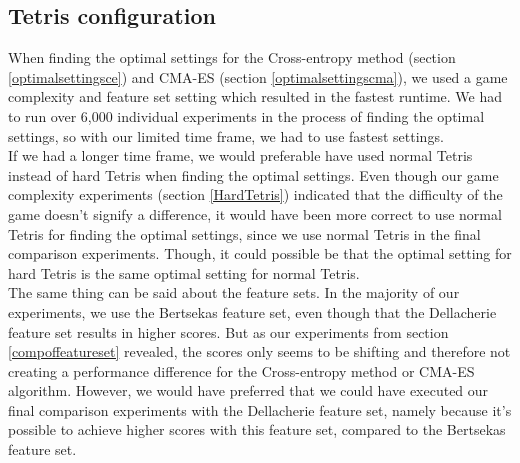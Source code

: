 \subsection{Tetris configuration}

When finding the optimal settings for the Cross-entropy method (section \ref{optimalsettingsce})
and CMA-ES (section \ref{optimalsettingscma}), we used a game complexity and feature set 
setting which resulted in the fastest runtime. We had to run over 6,000 individual experiments
in the process of finding the optimal settings, so with our limited time frame, we had
to use fastest settings.\\
If we had a longer time frame, we would preferable have used normal Tetris instead
of hard Tetris when finding the optimal settings. Even though our game complexity experiments
(section \ref{HardTetris}) indicated that the difficulty of the game doesn't signify a difference, it would have been more correct to use normal Tetris for finding the optimal settings, since
we use normal Tetris in the final comparison experiments. Though, it could possible be that the
optimal setting for hard Tetris is the same optimal setting for normal Tetris.\\
The same thing can be said about the feature sets. In the majority of our experiments, we
use the Bertsekas feature set, even though that the Dellacherie feature set results in
higher scores. But as our experiments from section \ref{compoffeatureset} revealed, the
scores only seems to be shifting and therefore not creating a performance difference for
the Cross-entropy method or CMA-ES algorithm. However, we would have preferred that we could have
executed our final comparison experiments with the Dellacherie feature set, namely because
it's possible to achieve higher scores with this feature set, compared to the Bertsekas feature
set.

